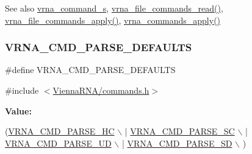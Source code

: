 \begin{DoxySeeAlso}{See also}
\hyperlink{group__file__utils_structvrna__command__s}{vrna\+\_\+command\+\_\+s}, \hyperlink{group__file__utils_ga5d2a64331cff5b1059e7d327545d8a63}{vrna\+\_\+file\+\_\+commands\+\_\+read()}, \hyperlink{group__file__utils_gadbe8c9622f7bcc6dcbe3448b98df8656}{vrna\+\_\+file\+\_\+commands\+\_\+apply()}, \hyperlink{group__file__utils_ga5e993fc4b9602af73aaaab4d3b3cd9a9}{vrna\+\_\+commands\+\_\+apply()} 
\end{DoxySeeAlso}
\mbox{\label{group__file__utils_ga0a6c88e21e366dca14958d69cd024008}} 
\subsubsection{\texorpdfstring{V\+R\+N\+A\+\_\+\+C\+M\+D\+\_\+\+P\+A\+R\+S\+E\+\_\+\+D\+E\+F\+A\+U\+L\+TS}{VRNA\_CMD\_PARSE\_DEFAULTS}}
{\footnotesize\ttfamily \#define V\+R\+N\+A\+\_\+\+C\+M\+D\+\_\+\+P\+A\+R\+S\+E\+\_\+\+D\+E\+F\+A\+U\+L\+TS}



{\ttfamily \#include $<$\hyperlink{commands_8h}{Vienna\+R\+N\+A/commands.\+h}$>$}

{\bfseries Value\+:}
\begin{DoxyCode}
(\hyperlink{group__file__utils_gac54dec838d7b6bebd5df85f71702d324}{VRNA\_CMD\_PARSE\_HC} \(\backslash\)
                                 | \hyperlink{group__file__utils_ga8cad3c1f83e6f149829c49a186a83e21}{VRNA\_CMD\_PARSE\_SC} \(\backslash\)
                                 | \hyperlink{group__file__utils_ga6c6409780698826b04ebfed9151d7649}{VRNA\_CMD\_PARSE\_UD} \(\backslash\)
                                 | \hyperlink{group__file__utils_gaf5e20210173cdb83bf70256a454f284b}{VRNA\_CMD\_PARSE\_SD} \(\backslash\)
                                 )
\end{DoxyCode}


